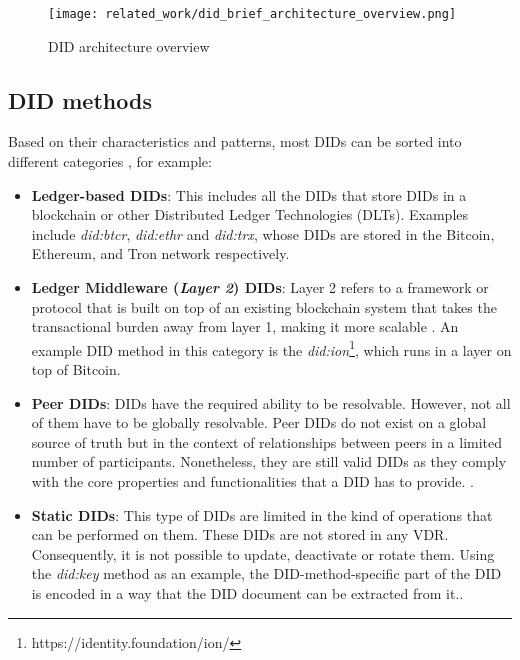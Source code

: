 \begin{figure}[H]
  \centering
  \texttt{[image: related\_work/did\_brief\_architecture\_overview.png]}
  \caption{DID architecture overview \cite{sporny_longley_sabadello_reed_steele_2021}}
  \label{fig:did_architecture}
\end{figure}

\subsection{DID methods}\label{subsec:did_methods}

 Based on their characteristics and patterns, most DIDs can be sorted into different categories \cite{preukschat_reed_2021}, for example: 

\begin{itemize}
  \item \textbf{Ledger-based DIDs}: This includes all the DIDs that store DIDs in a blockchain or other Distributed Ledger Technologies (DLTs). Examples include \emph{did:btcr}, \emph{did:ethr} and \emph{did:trx}, whose DIDs are stored in the Bitcoin, Ethereum, and Tron network respectively.
  \item \textbf{Ledger Middleware (\emph{Layer 2}) DIDs}: Layer 2 refers to a framework or protocol that is built on top of an existing blockchain system that takes the transactional burden away from layer 1, making it more scalable \cite{weston_2022}. An example DID method in this category is the \emph{did:ion}\footnote{https://identity.foundation/ion/}, which runs in a layer on top of Bitcoin. 
  \item \textbf{Peer DIDs}: DIDs have the required ability to be resolvable. However, not all of them have to be globally resolvable. Peer DIDs do not exist on a global source of truth but in the context of relationships between peers in a limited number of participants. Nonetheless, they are still valid DIDs as they comply with the core properties and functionalities that a DID has to provide. \cite{preukschat_reed_2021}.
  \item \textbf{Static DIDs}: This type of DIDs are limited in the kind of operations that can be performed on them. These DIDs are not stored in any VDR. Consequently, it is not possible to update, deactivate or rotate them. Using the \emph{did:key} method as an example, the DID-method-specific part of the DID is encoded in a way that the DID document can be extracted from it.\cite{longley_zagidulin_sporny_2022}.
\end{itemize}

